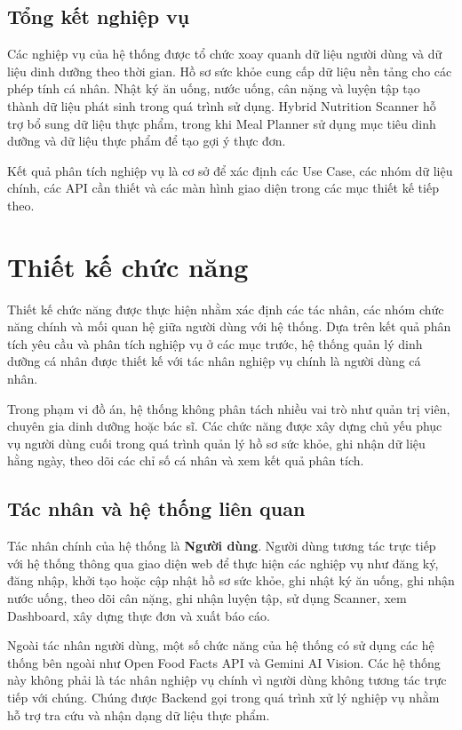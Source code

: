 \documentclass[12pt, a4paper]{report}
\begin{document}
\subsection{Tổng kết nghiệp vụ}Các nghiệp vụ của hệ thống được tổ chức xoay quanh dữ liệu người dùng và dữ liệu dinh dưỡng theo thời gian. Hồ sơ sức khỏe cung cấp dữ liệu nền tảng cho các phép tính cá nhân. Nhật ký ăn uống, nước uống, cân nặng và luyện tập tạo thành dữ liệu phát sinh trong quá trình sử dụng. Hybrid Nutrition Scanner hỗ trợ bổ sung dữ liệu thực phẩm, trong khi Meal Planner sử dụng mục tiêu dinh dưỡng và dữ liệu thực phẩm để tạo gợi ý thực đơn.

Kết quả phân tích nghiệp vụ là cơ sở để xác định các Use Case, các nhóm dữ liệu chính, các API cần thiết và các màn hình giao diện trong các mục thiết kế tiếp theo.

\section{Thiết kế chức năng}Thiết kế chức năng được thực hiện nhằm xác định các tác nhân, các nhóm chức năng chính và mối quan hệ giữa người dùng với hệ thống. Dựa trên kết quả phân tích yêu cầu và phân tích nghiệp vụ ở các mục trước, hệ thống quản lý dinh dưỡng cá nhân được thiết kế với tác nhân nghiệp vụ chính là người dùng cá nhân.

Trong phạm vi đồ án, hệ thống không phân tách nhiều vai trò như quản trị viên, chuyên gia dinh dưỡng hoặc bác sĩ. Các chức năng được xây dựng chủ yếu phục vụ người dùng cuối trong quá trình quản lý hồ sơ sức khỏe, ghi nhận dữ liệu hằng ngày, theo dõi các chỉ số cá nhân và xem kết quả phân tích.

\subsection{Tác nhân và hệ thống liên quan}Tác nhân chính của hệ thống là \textbf{Người dùng}. Người dùng tương tác trực tiếp với hệ thống thông qua giao diện web để thực hiện các nghiệp vụ như đăng ký, đăng nhập, khởi tạo hoặc cập nhật hồ sơ sức khỏe, ghi nhật ký ăn uống, ghi nhận nước uống, theo dõi cân nặng, ghi nhận luyện tập, sử dụng Scanner, xem Dashboard, xây dựng thực đơn và xuất báo cáo.

Ngoài tác nhân người dùng, một số chức năng của hệ thống có sử dụng các hệ thống bên ngoài như Open Food Facts API và Gemini AI Vision. Các hệ thống này không phải là tác nhân nghiệp vụ chính vì người dùng không tương tác trực tiếp với chúng. Chúng được Backend gọi trong quá trình xử lý nghiệp vụ nhằm hỗ trợ tra cứu và nhận dạng dữ liệu thực phẩm.
\end{document}
